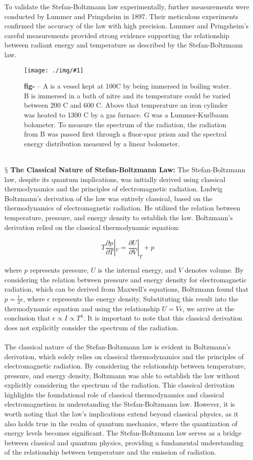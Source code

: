 \documentclass[9pt,a4paper, twocolumn]{article}
\newcounter{figurecounter}
\newcommand{\img}[3]{
    \begin{figure}[h!]
        \centering
        \captionsetup{justification=centering,margin=0cm,labelformat=empty}
        \texttt{[image: ./img/\#1]}
        \label{figure}
        \caption{\small\textbf{fig-\thefigurecounter} -- \textcolor{darkliver}{#3}}
    \end{figure}
    \addtocounter{figurecounter}{1}}
\newcommand{\newpoint}[1]{\ \\ \indent$\mathsection$ \textbf{#1}}
\begin{document}
        To validate the Stefan-Boltzmann law experimentally, further measurements were conducted by Lummer and Pringsheim in 1897. Their meticulous experiments confirmed the accuracy of the law with high precision. Lummer and Pringsheim's careful measurements provided strong evidence supporting the relationship between radiant energy and temperature as described by the Stefan-Boltzmann law.
        \img{LummerExperiment.jpeg}{1}{A is a vessel kept at 100C by being immersed in boiling water. B is immersed in a bath of nitre and its temperature could be varied between 200 C and 600 C. Above that temperature an iron cylinder was heated to 1300 C by a gas furnace. G was a Lummer-Kurlbaum bolometer. To measure the spectrum of the radiation, the radiation from B was passed first through a fluor-spar prism and the spectral energy distribution measured by a linear bolometer.}
        \newpoint{The Classical Nature of Stefan-Boltzmann Law:} The Stefan-Boltzmann law, despite its quantum implications, was initially derived using classical thermodynamics and the principles of electromagnetic radiation. Ludwig Boltzmann's derivation of the law was entirely classical, based on the thermodynamics of electromagnetic radiation. He utilized the relation between temperature, pressure, and energy density to establish the law. Boltzmann's derivation relied on the classical thermodynamic equation:

        \begin{equation}
            T\frac{\partial p}{\partial T}|_V = \frac{\partial U}{\partial V}|_T + p
        \end{equation}
        
        where $p$ represents pressure, $U$ is the internal energy, and $V$ denotes volume. By considering the relation between pressure and energy density for electromagnetic radiation, which can be derived from Maxwell's equations, Boltzmann found that $p = \frac{1}{3}\epsilon$, where $\epsilon$ represents the energy density. Substituting this result into the thermodynamic equation and using the relationship $U = V\epsilon$, we arrive at the conclusion that $\epsilon \propto I \propto T^4$. It is important to note that this classical derivation does not explicitly consider the spectrum of the radiation.
        \\
        \\    
        The classical nature of the Stefan-Boltzmann law is evident in Boltzmann's derivation, which solely relies on classical thermodynamics and the principles of electromagnetic radiation. By considering the relationship between temperature, pressure, and energy density, Boltzmann was able to establish the law without explicitly considering the spectrum of the radiation. This classical derivation highlights the foundational role of classical thermodynamics and classical electromagnetism in understanding the Stefan-Boltzmann law. However, it is worth noting that the law's implications extend beyond classical physics, as it also holds true in the realm of quantum mechanics, where the quantization of energy levels becomes significant. The Stefan-Boltzmann law serves as a bridge between classical and quantum physics, providing a fundamental understanding of the relationship between temperature and the emission of radiation.
\end{document}

